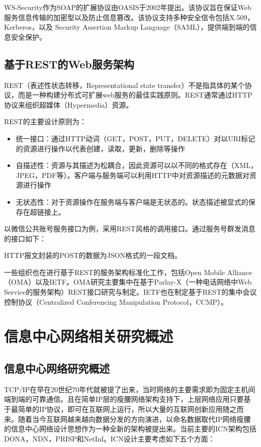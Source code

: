 WS-Security作为SOAP的扩展协议由OASIS于2002年提出。\cite{nadalin2002web}该协议旨在保证Web服务信息传输的加密型以及防止信息篡改。该协议支持多种安全信令包括X.509，Kerberos，以及 Security Assertion Markup Language（SAML），提供端到端的信息安全保护。

\subsection{基于REST的Web服务架构}
REST（表述性状态转移，Representational state transfer）不是指具体的某个协议，而是一种构建分布式可扩展web服务的最佳实践原则。REST通常通过HTTP协议来组织超媒体（Hypermedia）资源。

REST的主要设计原则为：
\begin{itemize}
\item 统一接口：通过HTTP动词（GET，POST，PUT，DELETE）对以URI标记的资源进行操作以代表创建，读取，更新，删除等操作
\item 自描述性：资源与其描述为松耦合，因此资源可以以不同的格式存在（XML，JPEG，PDF等）。客户端与服务端可以利用HTTP中对资源描述的元数据对资源进行操作
\item 无状态性：对于资源操作在服务端与客户端是无状态的。状态描述被显式的保存在超链接上。
\end{itemize}
以微信公共账号服务接口为例，采用REST风格的调用接口。通过服务号群发消息的接口如下：

\noindent
{}

HTTP报文封装的POST的数据为JSON格式的一段文档。

一些组织也在进行基于REST的服务架构标准化工作，包括Open Mobile Alliance（OMA）以及IETF。OMA研究主要集中在基于Parlay-X（一种电话网络中Web Service的服务架构）REST接口研究与制定。\cite{alliancerestful}IETF也在制定基于REST的集中会议控制协议（Centralized Conferencing Manipulation Protocol，CCMP）\cite{barnes2009centralized}。

\section{信息中心网络相关研究概述}
\subsection{信息中心网络研究概述}
TCP/IP在早在20世纪70年代就被提了出来，当时网络的主要需求即为固定主机间端到端的可靠通信。且在简单IP层的瘦腰网络架构支持下，上层网络应用只要基于最简单的IP协议，即可在互联网上运行，所以大量的互联网创新应用随之而来。随着当今互联网越来越向数据分发的方向演进，以命名数据取代IP网络瘦腰的信息中心网络设计思想作为一种全新的架构被提出来。当前主要的ICN架构包括DONA，NDN，PRISP和NetInf。ICN设计主要考虑如下五个方面\cite{xylomenos2014survey}：

